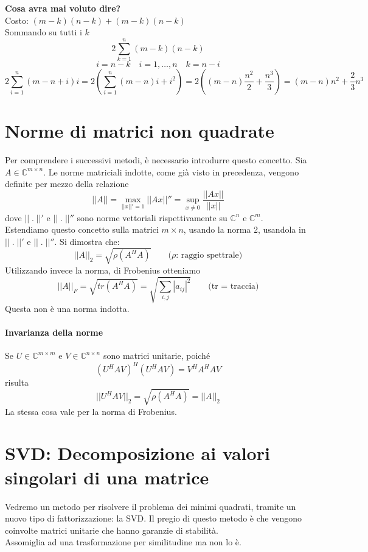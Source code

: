 \begin{workinprogress} \textbf{Cosa avra mai voluto dire?} \\ Costo:
$(m-k) (n-k) + (m-k)(n-k)$ \\ Sommando su tutti i $k$
$$
\displaystyle 2 \sum_{k=1}^{n} (m-k)(n-k)
$$
$$i =n-k \quad i =1, \ldots, n \quad k = n-i$$
$$ 
2 \displaystyle \sum_{i=1}^{n} (m-n+i)i = 2 (\displaystyle
\sum_{i=1}^{n} (m-n) i + \displaystyle i^{2}) = 2 (( m-n)
\frac{n^{2}}{2} + \frac{n^3}{3}) = (m-n)n^{2} + \frac{2}{3}n^{3}
$$   
\end{workinprogress}

\section{Norme di matrici non quadrate} Per comprendere i successivi
metodi, \`e necessario introdurre questo concetto.  Sia $A \in
\mathbb{C}^{m\times n}$. Le norme matriciali indotte, come gi\`a visto
in precedenza, vengono definite per mezzo della relazione
$$ || A|| = \max_{||x||' = 1} ||Ax ||'' = \sup_{x \neq 0}
\frac{||Ax||}{||x||}
$$
dove $|| \; . \; ||'$ e $|| \; . \; ||''$ sono norme vettoriali
rispettivamente su $\mathbb{C}^{n}$ e $\mathbb{C}^{m}$. \\ Estendiamo
questo concetto sulla matrici $m \times n$, usando la norma 2,
usandola in $|| \; . \; ||'$ e $|| \; . \; ||''$.  Si dimostra che:
$$ || A||_{2} = \sqrt{\rho(A^{H}A)}
\qquad \text{($\rho$: raggio spettrale)}
$$
Utilizzando invece la norma, di Frobenius otteniamo
$$ ||A||_{F} = \sqrt{tr(A^{H}A)} =
\sqrt{\displaystyle \sum_{i,j}|a_{ij}|^{2} } \qquad \text{(tr =
traccia)}
$$ 
Questa non è una norma indotta.

\paragraph{Invarianza della norme} Se $U \in \mathbb{C}^{m \times m}$
e $V \in \mathbb{C}^{n\times n}$ sono matrici unitarie, poiché
$$ (U^{H}AV)^{H}(U^{H}AV) = V^{H}A^{H}AV$$
risulta
$$|| U^{H}AV||_{2} = \sqrt{\rho(A^{H}A)} = ||A||_{2}$$
La stessa cosa vale per la norma di Frobenius. \\

\section{SVD: Decomposizione ai valori singolari di una matrice }
Vedremo un metodo per risolvere il problema dei minimi quadrati,
tramite un nuovo tipo di fattorizzazione: la SVD.  Il pregio di questo
metodo \`e che vengono coinvolte matrici unitarie che hanno garanzie di
stabilità. \\ 
Assomiglia ad una trasformazione per similitudine ma non lo \`e.

